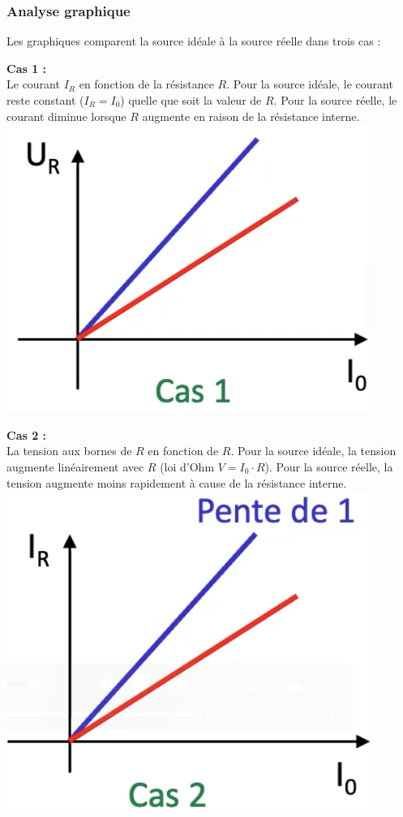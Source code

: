 \subsubsection{Analyse graphique}
Les graphiques comparent la source idéale à la source réelle dans trois cas : \\
\vspace{5px}
\begin{minipage}[t]{0.3\textwidth}
\small
\textbf{Cas 1 :} \\
Le courant $I_R$ en fonction de la résistance $R$. Pour la source idéale, le courant reste constant ($I_R = I_0$) quelle que soit la valeur de $R$. Pour la source réelle, le courant diminue lorsque $R$ augmente en raison de la résistance interne.
\vfill
\centering
\includegraphics[width=0.90\textwidth]{chapters/chapter1/images/cas1_i.png}
\end{minipage}
\hfill
\vline
\hfill
\begin{minipage}[t]{0.3\textwidth}
\small
\textbf{Cas 2 :} \\
La tension aux bornes de $R$ en fonction de $R$. Pour la source idéale, la tension augmente linéairement avec $R$ (loi d'Ohm $V = I_0 \cdot R$). Pour la source réelle, la tension augmente moins rapidement à cause de la résistance interne.
\vfill
\centering
\includegraphics[width=0.90\textwidth]{chapters/chapter1/images/cas2_i.png}
\end{minipage}
